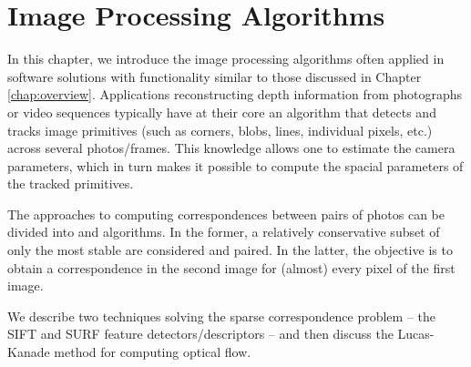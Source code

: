 
\chapter{Image Processing Algorithms}
\label{chap:algorithms}

In this chapter, we introduce the image processing algorithms often applied in software solutions with functionality similar to those discussed in Chapter \ref{chap:overview}. 
Applications reconstructing depth information from photographs or video sequences typically have at their core an algorithm that detects and tracks image primitives (such as corners, blobs, lines, individual pixels, etc.) across several photos/frames. 
This knowledge allows one to estimate the camera parameters, which in turn makes it possible to compute the spacial parameters of the tracked primitives.

The approaches to computing correspondences between pairs of photos can be divided into  and  algorithms. 
In the former, a relatively conservative subset of only the most stable  are considered and paired. 
In the latter, the objective is to obtain a correspondence in the second image for (almost) every pixel of the first image. 

We describe two techniques solving the sparse correspondence problem -- the SIFT \cite{lowe1999} and SURF \cite{surf2006} feature detectors/descriptors -- and then discuss the Lucas-Kanade method for computing optical flow. %

